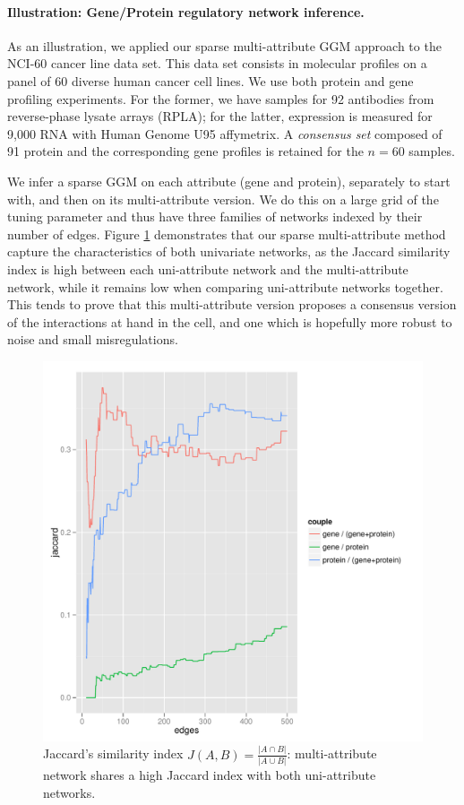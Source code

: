 \paragraph*{Illustration: Gene/Protein regulatory network inference.}
As an illustration, we applied our sparse multi-attribute GGM approach
to  the NCI-60  cancer  line  data set.   This  data  set consists  in
molecular  profiles  on  a  panel  of 60  diverse  human  cancer  cell
lines. We  use both protein  and gene profiling experiments.   For the
former, we  have  samples for  92 antibodies  from reverse-phase
lysate arrays (RPLA); for the latter, expression is measured for 9,000
RNA with Human Genome U95 affymetrix.  A \emph{consensus set} composed
of 91  protein and the  corresponding gene profiles is  retained for
the $n=60$ samples.

We infer  a sparse  GGM on  each attribute  (gene and  protein), 
separately to start with, and then on its multi-attribute version.  We do this on a large
grid  of the  tuning parameter  and thus  have  three families  of
networks    indexed    by    their   number    of    edges.     Figure
\ref{fig:net_jaccard}  demonstrates  that our  sparse  multi-attribute
method capture the characteristics of both univariate networks, as the
Jaccard similarity  index is  high between each  uni-attribute network
and the multi-attribute  network, while it remains  low when comparing
uni-attribute  networks  together.  This  tends  to  prove  that  this
multi-attribute   version  proposes   a   consensus   version  of   the
interactions at hand in the cell, and one which is hopefully more robust to noise and
small misregulations.
\begin{figure}[htbp!]
  \centering
  \includegraphics[width=.9\textwidth]{figures/net_jaccard}
  \caption{Jaccard's  similarity index  $J(A,B) =  \frac{\left|A\cap
        B\right|}{\left|A\cup  B\right|}$:  multi-attribute  network
    shares a high Jaccard index with both uni-attribute networks.}
  \label{fig:net_jaccard}
\end{figure}
